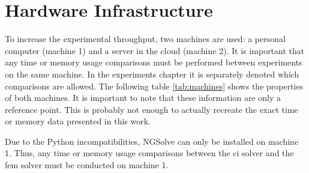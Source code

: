 \documentclass[./\jobname.tex]{subfiles}
\begin{document}
\section{Hardware Infrastructure}
\label{chap:hardware_setup}

To increase the experimental throughput, two machines are used: a personal computer (machine 1) and a server in the cloud (machine 2). It is important that any time or memory usage comparisons must be performed between experiments on the same machine. In the experiments chapter it is separately denoted which comparisons are allowed. The following table \ref{tab:machines} shows the properties of both machines. It is important to note that these information are only a reference point. This is probably not enough to actually recreate the exact time or memory data presented in this work. 

\begin{table}[h]
	\centering
	\noindent{}
	\label{tab:machines}
\end{table}

Due to the Python incompatibilities, NGSolve can only be installed on machine 1. Thus, any time or memory usage comparisons between the \gls{ci} solver and the \gls{fem} solver must be conducted on machine 1. 
\end{document}
